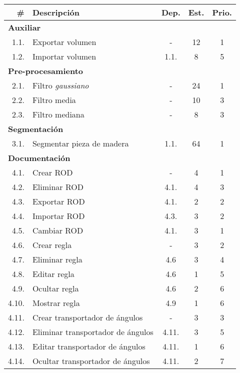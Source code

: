 \begin{longtable} {r l c c c}
	\hline
	\#	&	\textbf{Descripción}					&	\textbf{Dep.}	&	\textbf{Est.}	&	\textbf{Prio.}	\\
	\hline \hline
	\endhead
	\multicolumn{5}{l}{\textbf{Auxiliar}} \\
	\hline 
	1.1.	&	Exportar volumen					&	-				&	12				&	1	\\
	\hline
	1.2.	&	Importar volumen					&	1.1.			&	8				&	5	\\
	\hline
	\multicolumn{5}{l}{\textbf{Pre-procesamiento}} \\
	\hline 
	2.1.	&	Filtro \textit{gaussiano}			&	-				&	24				&	1	\\
	\hline
	2.2.	&	Filtro media						&	-				&	10				&	3	\\
	\hline
	2.3.	&	Filtro mediana						&	-				&	8				&	3	\\
	\hline
	\multicolumn{5}{l}{\textbf{Segmentación}} \\
	\hline 
	3.1.	&	Segmentar pieza de madera			&	1.1.			&	64				&	1	\\
	\hline
	\multicolumn{5}{l}{\textbf{Documentación}} \\
	\hline 
	4.1.	&	Crear ROD							&	-				&	4				&	1	\\
	\hline
	4.2.	&	Eliminar ROD						&	4.1.			&	4				&	3	\\
	\hline
	4.3.	&	Exportar ROD						&	4.1.			&	2				&	2	\\
	\hline
	4.4.	&	Importar ROD						&	4.3.			&	3				&	2	\\
	\hline
	4.5.	&	Cambiar ROD							&	4.1.			&	3				&	1	\\
	\hline
	4.6.	&	Crear regla							&	-				&	3				&	2	\\
	\hline
	4.7.	&	Eliminar regla						&	4.6				&	3				&	4	\\
	\hline
	4.8.	&	Editar regla						&	4.6				&	1				&	5	\\
	\hline
	4.9.	&	Ocultar regla						&	4.6				&	2				&	6	\\
	\hline
	4.10.	&	Mostrar regla						&	4.9				&	1				&	6	\\
	\hline
	4.11.	&	Crear transportador de ángulos		&	-				&	3				&	3	\\
	\hline
	4.12.	&	Eliminar transportador de ángulos	&	4.11.			&	3				&	5	\\
	\hline
	4.13.	&	Editar transportador de ángulos		&	4.11.			&	1				&	6	\\
	\hline
	4.14.	&	Ocultar transportador de ángulos	&	4.11.			&	2				&	7	\\

\end{longtable}
